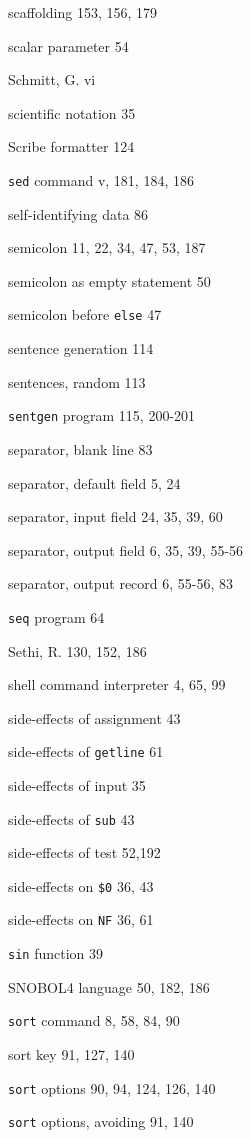 \begin{multicols}{3}
scaffolding 153, 156, 179

scalar parameter 54

Schmitt, G. vi

scientific notation 35

Scribe formatter 124

\verb'sed' command v, 181, 184, 186

self-identifying data 86

semicolon 11, 22, 34, 47, 53, 187

semicolon as empty statement 50

semicolon before \verb'else' 47

sentence generation 114

sentences, random 113

\verb'sentgen' program 115, 200-201

separator, blank line 83

separator, default field 5, 24

separator, input field 24, 35, 39, 60

separator, output field 6, 35, 39, 55-56

separator, output record 6, 55-56,  83

\verb'seq' program 64

Sethi, R. 130, 152, 186

shell command interpreter 4, 65, 99

side-effects of assignment 43

side-effects of \verb'getline' 61

side-effects of input 35

side-effects of \verb'sub' 43

side-effects of test 52,192

side-effects on \verb'$0' 36, 43

side-effects on \verb'NF' 36, 61

\verb'sin' function 39

SNOBOL4 language 50, 182, 186

\verb'sort' command 8, 58, 84, 90

sort key 91, 127, 140

\verb'sort' options 90, 94, 124, 126, 140

\verb'sort' options, avoiding 91, 140


\end{multicols}

